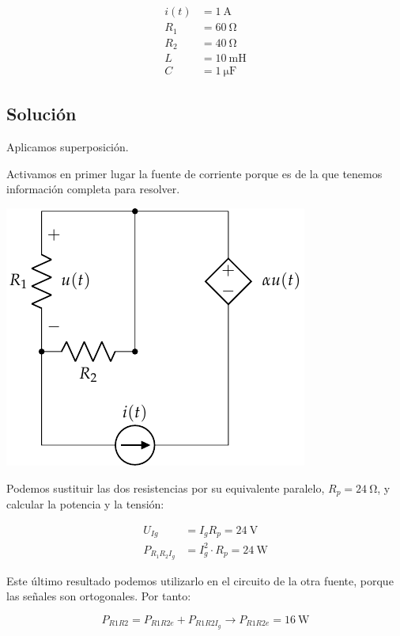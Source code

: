\documentclass[12pt]{article}
\begin{document}
\begin{align*}
  i(t) &= \SI{1}{\ampere}\\
  R_1 &= \SI{60}{\ohm}\\
  R_2 &= \SI{40}{\ohm}\\
  L &= \SI{10}{\milli\henry}\\
  C &= \SI{1}{\micro\farad}
\end{align*}

\noindent\hrulefill

\subsection*{Solución}

Aplicamos superposición.

Activamos en primer lugar la fuente de corriente porque es de la que tenemos información completa para resolver.

\begin{center}
  \includegraphics{../figs/superposicion3_DC}
\end{center}

Podemos sustituir las dos resistencias por su equivalente paralelo, $R_p = \SI{24}{\ohm}$, y calcular la potencia y la tensión:

\begin{align*}
  U_{Ig} &= I_g R_p = \SI{24}{\volt}\\
  P_{R_1R_2I_g} &= I_g^2 \cdot R_p = \SI{24}{\watt}
\end{align*}

Este último resultado podemos utilizarlo en el circuito de la otra fuente, porque las señales son ortogonales. Por tanto:

\begin{equation*}
  P_{R1R2} = P_{R1R2e} + P_{R1R2I_g} \rightarrow P_{R1R2e} = \SI{16}{\watt}
\end{equation*}
\end{document}
